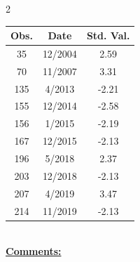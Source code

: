 
\bigskip 
\begin{multicols}{2}{ 
\begin{tabular}{ccc}
\hline  Obs.  &  Date &  Std. Val. \\ 
\hline 
                       35 &       12/2004 &          2.59 \vspace{-.12in} \\  
                       70 &       11/2007 &          3.31 \vspace{-.12in} \\  
                      135 &        4/2013 &         -2.21 \vspace{-.12in} \\  
                      155 &       12/2014 &         -2.58 \vspace{-.12in} \\  
                      156 &        1/2015 &         -2.19 \vspace{-.12in} \\  
                      167 &       12/2015 &         -2.13 \vspace{-.12in} \\  
                      196 &        5/2018 &          2.37 \vspace{-.12in} \\  
                      203 &       12/2018 &         -2.13 \vspace{-.12in} \\  
                      207 &        4/2019 &          3.47 \vspace{-.12in} \\  
                      214 &       11/2019 &         -2.13 \vspace{-.12in} \\  
 \end{tabular} 
\\ 
 \columnbreak 
 \singlespacing 
 \underline{\textbf{Comments:}} \\ 
 \bigskip       

 } 
\end{multicols} 
